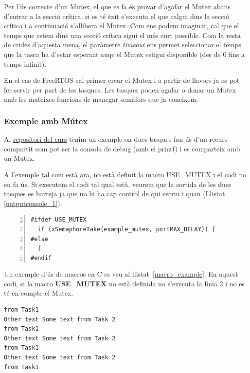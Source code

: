 Per l'ús correcte d'un Mutex, el que es fa és provar d'agafar el Mutex abans d'entrar a la secció crítica, si es té èxit s'executa el que calgui dins la secció crítica i a continuació s'allibera el Mutex. Com ens podem imaginar, cal que el temps que estem dins una secció crítica sigui el més curt possible. Com la resta de crides d'aquesta mena, el paràmetre {\em timeout} ens permet seleccionar el temps que la tasca ha d'estar esperant auqe el Mutex estigui disponible (des de 0 fins a temps infinit).

En el cas de FreeRTOS cal primer crear el Mutex i a partir de llavors ja es pot fer servir per part de les tasques. Les tasques poden agafar o donar un Mutex amb les mateixes funcions de manegar semàfors que ja coneixem.



\subsubsection{Exemple amb Mútex}
\label{sub:mutex_exemple}
Al \href{https://github.com/mariusmm/cursembedded/tree/master/Simplicity/FreeRTOS_Mutex}{repositori del curs} tenim un exemple on dues tasques fan ús d'un recurs compartit com pot ser la consola de debug (amb el printf) i es comparteix amb un Mutex.

A l'exemple tal com està ara, no està definit la macro USE\_MUTEX i el codi no en fa ús. Si executem el codi tal qual està, veurem que la sortida de les dues tasques es barreja ja que no hi ha cap control de qui escriu i quan (Llistat \ref{outputconsole_1}).

\begin{lstlisting}[style=customc, numbers=left, caption=Exemple d'ús de macros en C, label=macro_example]
#ifdef USE_MUTEX
  if (xSemaphoreTake(example_mutex, portMAX_DELAY)) {
#else
  {
#endif
\end{lstlisting}

\begin{remark}
 Un exemple d'ús de macros en C es veu al llistat~\ref{macro_example}. En aquest codi, si la macro {\bf USE\_MUTEX} no està definida no s'executa la línia 2 i no es té en compte el Mutex.
\end{remark}


\begin{lstlisting}[style=customc, label=outputconsole_1, caption=Sortida de la consola sense Mutex]
from Task1
Other text Some text from Task 2
from Task1
Other text Some text from Task 2
from Task1
Other text Some text from Task 2
from Task1
\end{lstlisting}

